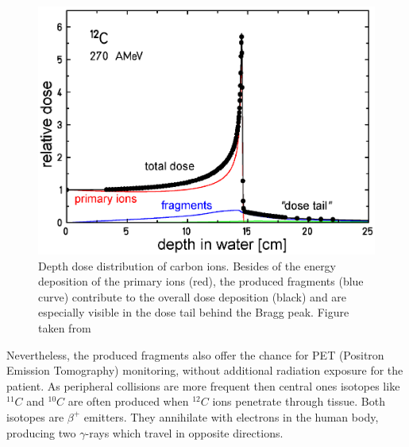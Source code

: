 \documentclass[type=dr, dr=rernat, accentcolor=tud7b,colorbacktitle, bigchapter, openright, twoside, 12pt ]{tudthesis}
\begin{document}
\begin{figure}[H]
\begin{center}
\includegraphics[scale=0.3]{./Images/iondepthdosesum.png}
\caption{Depth dose distribution of carbon ions. Besides of the energy deposition of the primary ions (red), the produced fragments 
(blue curve) contribute to the overall dose deposition (black) and are especially visible in the dose tail behind the Bragg 
peak. Figure taken from \cite{Groezinger2004}}
\label{iondd}
\end{center}
\end{figure}

Nevertheless, the produced fragments  also offer the chance for PET (Positron Emission Tomography) monitoring, 
without additional radiation exposure for the patient. As peripheral collisions are more frequent then central ones \cite{Kra00} 
isotopes like $^{11}C$ and $^{10}C$ are often produced when $^{12}C$ ions penetrate through tissue. Both isotopes are $\beta^{+}$ 
emitters. They annihilate with electrons in the human body, producing two $\gamma$-rays which travel in opposite directions.

% 
% 

{}
% 
\end{document}
